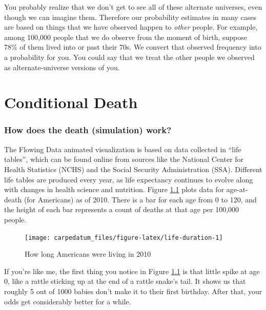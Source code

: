 \documentclass[openany]{book}
\begin{document}
You probably realize that we don't get to see all of these alternate universes, even though we can imagine them. Therefore our probability estimates in many cases are based on things that we have observed happen to \emph{other} people. For example, among 100,000 people that we do observe from the moment of birth, suppose 78\% of them lived into or past their 70s. We convert that observed frequency into a probability for you. You could say that we treat the other people we observed as alternate-universe versions of you.

\hypertarget{conditional-death}{%
\chapter{Conditional Death}\label{conditional-death}}

\hypertarget{how-does-the-death-simulation-work}{%
\subsection*{How does the death (simulation) work?}\label{how-does-the-death-simulation-work}}

The Flowing Data animated visualization is based on data collected in ``life tables'', which can be found online from sources like the National Center for Health Statistics (NCHS) and the Social Security Administration (SSA). Different life tables are produced every year, as life expectancy continues to evolve along with changes in health science and nutrition. Figure \ref{fig:life-duration} plots data for age-at-death (for Americans) as of 2010. There is a bar for each age from 0 to 120, and the height of each bar represents a count of deaths at that age per 100,000 people.

\begin{figure}[H]

{\centering \texttt{[image: carpedatum\_files/figure-latex/life-duration-1]} 

}

\caption{How long Americans were living in 2010}\label{fig:life-duration}
\end{figure}

If you're like me, the first thing you notice in Figure \ref{fig:life-duration} is that little spike at age 0, like a rattle sticking up at the end of a rattle snake's tail. It shows us that roughly 5 out of 1000 babies don't make it to their first birthday. After that, your odds get considerably better for a while.
\end{document}
